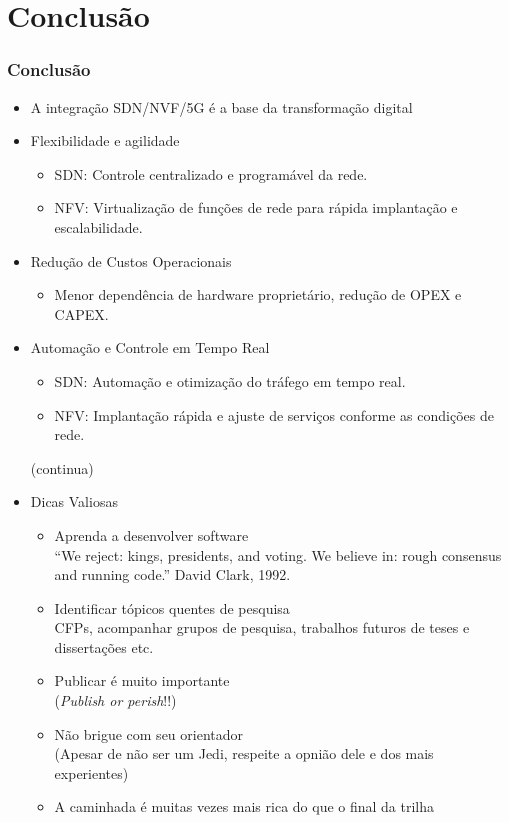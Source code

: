 
\section{Conclusão}
\begin{frame}[allowframebreaks]
    \frametitle{Conclusão}
    \begin{itemize}
        \item A integração SDN/NVF/5G é a base da transformação digital
        \item Flexibilidade e agilidade
        \begin{itemize}
            \item SDN: Controle centralizado e programável da rede.
            \item NFV: Virtualização de funções de rede para rápida implantação e escalabilidade.
        \end{itemize}
        \item Redução de Custos Operacionais
        \begin{itemize}
            \item Menor dependência de hardware proprietário, redução de OPEX e CAPEX.
        \end{itemize}
        \item Automação e Controle em Tempo Real
        \begin{itemize}
            \item SDN: Automação e otimização do tráfego em tempo real.
            \item NFV: Implantação rápida e ajuste de serviços conforme as condições de rede.
        \end{itemize}
        (continua)
        \item Dicas Valiosas
        \begin{itemize}
            \item Aprenda a desenvolver software \\
            {\small
            ``We reject: kings, presidents, and voting. We believe in: rough consensus and running code.'' David Clark, 1992.
            }
            \item Identificar tópicos quentes de pesquisa \\
            {\small CFPs, acompanhar grupos de pesquisa, trabalhos futuros de teses e dissertações etc.}
            \item Publicar é muito importante \\ 
            {\small (\textit{Publish or perish}!!)}
            \item Não brigue com seu orientador \\
            {\small (Apesar de não ser um Jedi, respeite a opnião dele e dos mais experientes)}
            \item A caminhada é muitas vezes mais rica do que o final da trilha
        \end{itemize}
    \end{itemize}
\end{frame}